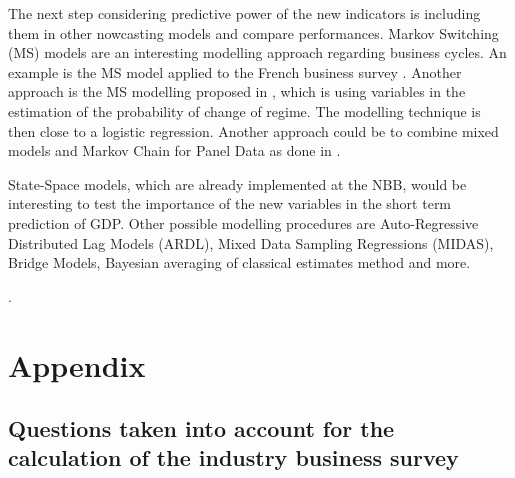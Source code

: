 \documentclass[12pt,a4paper,oneside]{book}
\begin{document}
The next step considering predictive power of the new indicators is including them in other nowcasting models and compare performances. 
Markov Switching (MS) models \citep{hamilton_new_1989} are an interesting modelling approach regarding business cycles. An example is the MS model applied to the French business survey \cite{bardaji_constructing_2009}.
Another approach is the MS modelling proposed in \cite{duprey_how_2017}, which is using variables in the estimation of the probability of change of regime. The modelling technique is then close to a logistic regression. 
Another approach could be to combine mixed models and Markov Chain for Panel Data as done in \citep{de_haan-rietdijk_use_2017}.

State-Space models, which are already implemented at the NBB, would be interesting to test the importance of the new variables in the short term prediction of GDP.
Other possible modelling procedures are Auto-Regressive Distributed Lag Models (ARDL), 
Mixed Data Sampling Regressions (MIDAS), 
Bridge Models,
Bayesian averaging of classical estimates method \citep{bialowolski_bayesian_2014}
and more.

\nocite{foroni_comparison_2014}.



\nocite{binder_business_1995}
\nocite{dresse_survey_2008}
\nocite{lemasson_enquete_2017}
\nocite{mevik_uncertainty_2004}


\newpage

 


\appendix  
\newpage
{}
\listoffigures 

\newpage
{}
 \listoftables 
 
\renewcommand\thesection{\Roman{section}}


\chapter*{Appendix}


\section{Questions taken into account for the calculation of the industry business survey}
\label{Appendix: Question NS975 description}
\end{document}
